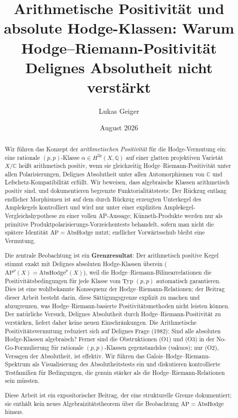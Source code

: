 \documentclass[aps,prd,twocolumn,superscriptaddress,nofootinbib]{revtex4-2}
\theoremstyle{definition}
\theoremstyle{remark}
\def\\{ }%
\begin{document}

\title{Arithmetische Positivität und absolute Hodge-Klassen:\\Warum Hodge--Riemann-Positivität\\Delignes Absolutheit nicht verstärkt}

\author{Lukas Geiger}

\date{August 2026}

\begin{abstract}
Wir führen das Konzept der \textit{arithmetischen Positivität} für die Hodge-Vermutung ein: eine rationale $(p,p)$-Klasse $\alpha \in H^{2p}(X, \mathbb{Q})$ auf einer glatten projektiven Varietät $X/\mathbb{C}$ heißt arithmetisch positiv, wenn sie gleichzeitig Hodge--Riemann-Positivität unter allen Polarisierungen, Delignes Absolutheit unter allen Automorphismen von $\mathbb{C}$ und Lefschetz-Kompatibilität erfüllt. Wir beweisen, dass algebraische Klassen arithmetisch positiv sind, und dokumentieren begrenzte Funktorialitätstests: Der Rückzug entlang endlicher Morphismen ist auf dem durch Rückzug erzeugten Unterkegel des Amplekegels kontrolliert und wird nur unter einer expliziten Amplekegel-Vergleichshypothese zu einer vollen AP-Aussage; Künneth-Produkte werden nur als primitive Produktpolarisierungs-Vorzeichentests behandelt, sofern man nicht die spätere Identität $\mathrm{AP}=\mathrm{AbsHodge}$ nutzt; endlicher Vorwärtsschub bleibt eine Vermutung.

Die zentrale Beobachtung ist ein \textbf{Grenzresultat}: Der arithmetisch positive Kegel stimmt exakt mit Delignes absoluten Hodge-Klassen überein ($\mathrm{AP}^p(X) = \mathrm{AbsHodge}^p(X)$), weil die Hodge--Riemann-Bilinearrelationen die Positivitätsbedingungen für jede Klasse vom Typ $(p,p)$ automatisch garantieren. Dies ist eine wohlbekannte Konsequenz der Hodge--Riemann-Relationen; der Beitrag dieser Arbeit besteht darin, diese Sättigungsgrenze explizit zu machen und abzugrenzen, was Hodge--Riemann-basierte Positivitätsmethoden nicht leisten können. Der natürliche Versuch, Delignes Absolutheit durch Hodge--Riemann-Positivität zu verstärken, liefert daher keine neuen Einschränkungen. Die Arithmetische Positivitätsvermutung reduziert sich auf Delignes Frage (1982): \glqq Sind alle absoluten Hodge-Klassen algebraisch?\grqq{} Ferner sind die Obstruktionen (O1) und (O3) in der No-Go-Formulierung für rationale $(p,p)$-Klassen gegenstandslos (vakuos); nur (O2), Versagen der Absolutheit, ist effektiv. Wir führen das Galois--Hodge--Riemann-Spektrum als Visualisierung des Absolutheitstests ein und diskutieren kontrollierte Testfamilien für Bedingungen, die genuin stärker als die Hodge--Riemann-Relationen sein müssten.

Diese Arbeit ist ein expositorischer Beitrag, der eine strukturelle Grenze dokumentiert; sie enthält kein neues Algebraizitätstheorem über die Beobachtung $\mathrm{AP} = \mathrm{AbsHodge}$ hinaus.
\end{abstract}
\end{document}
